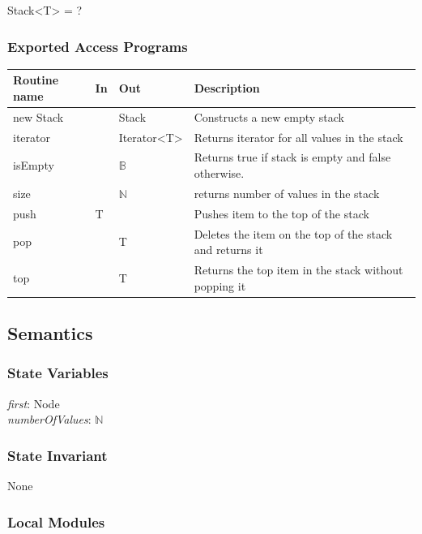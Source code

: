 \documentclass[12pt]{article}
\begin{document}
                Stack<T> = ?
                
                \subsubsection* {Exported Access Programs}
                
                
                \begin{tabular}{| l | l | l | p{5cm} |}
                \hline
                \textbf{Routine name} & \textbf{In} & \textbf{Out} & \textbf{Description}\\
                \hline
                new Stack &  & Stack & Constructs a new empty stack\\
                \hline 
                 iterator & ~ & Iterator<T> & Returns iterator for all values in the stack\\
                \hline 
                isEmpty& ~ & $\mathbb{B}$ & Returns true if stack is empty and false otherwise.\\
                \hline 
                size& ~ &$\mathbb{N}$ &returns number of values in the stack\\
                \hline 
                push& T & ~ &Pushes item to the top of the stack\\
                \hline
                pop & ~ & T & Deletes the item on the top of the stack and returns it\\
                \hline
                top& ~ & T &Returns the top item in the stack without popping it\\
                \hline
                \end{tabular}
                \subsection* {Semantics}
                    \subsubsection *{State Variables} 
                        \textit{first}: Node\\
                        \textit{numberOfValues}: $\mathbb{N}$
                    \subsubsection *{State Invariant} None
                    
                    \subsubsection* {Local Modules}
                
\end{document}
